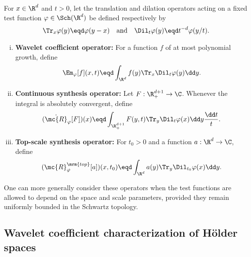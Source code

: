 \begin{definition} \label{def:wavelet-operators} For \(x \in \R^d\) and \(t > 0\), let the translation and dilation operators acting on a fixed test function \(\varphi \in \Sch(\R^d)\) be defined respectively by
\[
\Tr_x\varphi(y) \eqd \varphi(y-x)
\quad \text{and} \quad
\Dil_t\varphi(y) \eqd t^{-d}\varphi(y/t).
\]
\begin{enumerate}[(i)]
\item \textbf{Wavelet coefficient operator:} For a function \(f\) of at most polynomial growth, define
\begin{equation} \label{eq:wavelet-coefficient-fixed-test}
\Em_{\varphi}[f](x,t) \eqd
\int_{\R^d} f(y)\Tr_x\Dil_t\varphi(y)\dd y.
\end{equation}

\item \textbf{Continuous synthesis operator:} Let \(F:\R^{d+1}_+\to\C\).
Whenever the integral is absolutely convergent, define
\begin{equation} \label{eq:synthesis-operator}
(\dot{\mc{R}}_{\varphi}[F])(x) \eqd
\int_{\R^{d+1}_{+}} F(y,t)\Tr_y\Dil_t\varphi(x) \dd y\frac{\dd t}{t}.
\end{equation}

\item \textbf{Top-scale synthesis operator:} For \(t_0>0\) and a function \(a:\R^d\to\C\), define
\begin{equation} \label{eq:top-scale-synthesis-operator}
(\mc{R}^{\mrm{top}}_{\varphi}[a])(x,t_0) \eqd
\int_{\R^d} a(y)\Tr_y\Dil_{t_0}\varphi(x)\dd y.
\end{equation}
\end{enumerate}
\end{definition}

\begin{remark} \label{rem:variable-test-functions} One can more generally consider these operators when the test functions are allowed to depend on the space and scale parameters, provided they remain uniformly bounded in the Schwartz topology.
\end{remark}

\subsection{Wavelet coefficient characterization of H{\"o}lder spaces}

